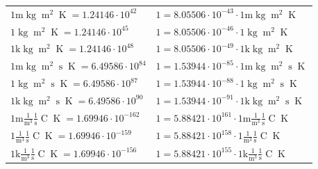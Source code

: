 \begin{center}
\begin{longtable}{l l}
{\color{gray}$1 \bm{\mathrm{ m}}\operatorname{kg}{\operatorname{m}^2}{}{}{\operatorname{K}} = 1.24146\cdot10^{42} $}   & {\color{gray}$ 1 = 8.05506\cdot10^{-43} \cdot 1 \bm{\mathrm{ m}}\operatorname{kg}{\operatorname{m}^2}{}{}{\operatorname{K}}$}  \\
{\color{black}$1 \bm{\mathrm{ }}\operatorname{kg}{\operatorname{m}^2}{}{}{\operatorname{K}} = 1.24146\cdot10^{45} $}   & {\color{black}$ 1 = 8.05506\cdot10^{-46} \cdot 1 \bm{\mathrm{ }}\operatorname{kg}{\operatorname{m}^2}{}{}{\operatorname{K}}$}  \\
{\color{gray}$1 \bm{\mathrm{ k}}\operatorname{kg}{\operatorname{m}^2}{}{}{\operatorname{K}} = 1.24146\cdot10^{48} $}   & {\color{gray}$ 1 = 8.05506\cdot10^{-49} \cdot 1 \bm{\mathrm{ k}}\operatorname{kg}{\operatorname{m}^2}{}{}{\operatorname{K}}$}  \\
{\color{gray}$1 \bm{\mathrm{ m}}\operatorname{kg}{\operatorname{m}^2}{\operatorname{s}}{}{\operatorname{K}} = 6.49586\cdot10^{84} $}   & {\color{gray}$ 1 = 1.53944\cdot10^{-85} \cdot 1 \bm{\mathrm{ m}}\operatorname{kg}{\operatorname{m}^2}{\operatorname{s}}{}{\operatorname{K}}$}  \\
{\color{black}$1 \bm{\mathrm{ }}\operatorname{kg}{\operatorname{m}^2}{\operatorname{s}}{}{\operatorname{K}} = 6.49586\cdot10^{87} $}   & {\color{black}$ 1 = 1.53944\cdot10^{-88} \cdot 1 \bm{\mathrm{ }}\operatorname{kg}{\operatorname{m}^2}{\operatorname{s}}{}{\operatorname{K}}$}  \\
{\color{gray}$1 \bm{\mathrm{ k}}\operatorname{kg}{\operatorname{m}^2}{\operatorname{s}}{}{\operatorname{K}} = 6.49586\cdot10^{90} $}   & {\color{gray}$ 1 = 1.53944\cdot10^{-91} \cdot 1 \bm{\mathrm{ k}}\operatorname{kg}{\operatorname{m}^2}{\operatorname{s}}{}{\operatorname{K}}$}  \\
\hline{\color{gray}$1 \bm{\mathrm{ m}}\frac1{\operatorname{m}^3}\frac1{\operatorname{s}}{\operatorname{C}}{\operatorname{K}} = 1.69946\cdot10^{-162} $}   & {\color{gray}$ 1 = 5.88421\cdot10^{161} \cdot 1 \bm{\mathrm{ m}}\frac1{\operatorname{m}^3}\frac1{\operatorname{s}}{\operatorname{C}}{\operatorname{K}}$}  \\
{\color{black}$1 \bm{\mathrm{ }}\frac1{\operatorname{m}^3}\frac1{\operatorname{s}}{\operatorname{C}}{\operatorname{K}} = 1.69946\cdot10^{-159} $}   & {\color{black}$ 1 = 5.88421\cdot10^{158} \cdot 1 \bm{\mathrm{ }}\frac1{\operatorname{m}^3}\frac1{\operatorname{s}}{\operatorname{C}}{\operatorname{K}}$}  \\
{\color{gray}$1 \bm{\mathrm{ k}}\frac1{\operatorname{m}^3}\frac1{\operatorname{s}}{\operatorname{C}}{\operatorname{K}} = 1.69946\cdot10^{-156} $}   & {\color{gray}$ 1 = 5.88421\cdot10^{155} \cdot 1 \bm{\mathrm{ k}}\frac1{\operatorname{m}^3}\frac1{\operatorname{s}}{\operatorname{C}}{\operatorname{K}}$}  \\

\end{longtable}
\end{center}
